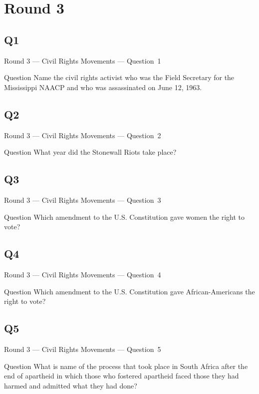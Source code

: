 \documentclass[11pt]{beamer}
\begin{document}
\section{Round 3}
\subsection*{Q1}
\begin{frame}[t]{Round 3 --- Civil Rights Movements --- \mbox{Question 1}}
\vspace{-0.5em}
\begin{block}{Question}
Name the civil rights activist who was the Field Secretary for the Mississippi NAACP and who was assassinated on June 12, 1963.
\end{block}
\end{frame}
\subsection*{Q2}
\begin{frame}[t]{Round 3 --- Civil Rights Movements --- \mbox{Question 2}}
\vspace{-0.5em}
\begin{block}{Question}
What year did the Stonewall Riots take place?
\end{block}
\end{frame}
\subsection*{Q3}
\begin{frame}[t]{Round 3 --- Civil Rights Movements --- \mbox{Question 3}}
\vspace{-0.5em}
\begin{block}{Question}
Which amendment to the U.S. Constitution gave women the right to vote?
\end{block}
\end{frame}
\subsection*{Q4}
\begin{frame}[t]{Round 3 --- Civil Rights Movements --- \mbox{Question 4}}
\vspace{-0.5em}
\begin{block}{Question}
Which amendment to the U.S. Constitution gave African-Americans the right to vote?
\end{block}
\end{frame}
\subsection*{Q5}
\begin{frame}[t]{Round 3 --- Civil Rights Movements --- \mbox{Question 5}}
\vspace{-0.5em}
\begin{block}{Question}
What is name of the process that took place in South Africa after the end of apartheid in which those who fostered apartheid faced those they had harmed and admitted what they had done?
\end{block}
\end{frame}
\end{document}
